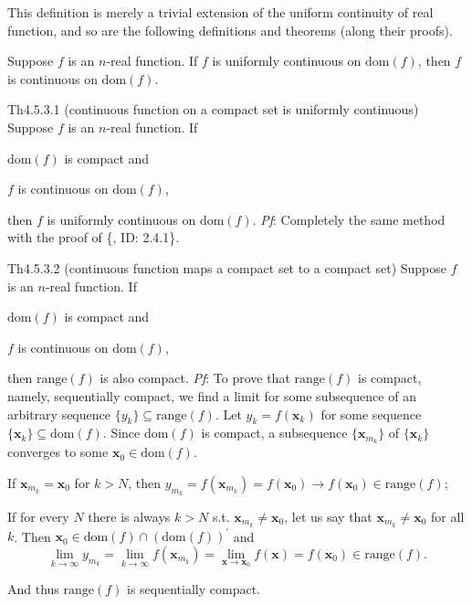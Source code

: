 \documentclass{article}
\begin{document}
\begin{Rmk}{}
    This definition is merely a trivial extension of the uniform continuity of real function, and so are the following definitions and theorems (along their proofs).
    \begin{compactenum}
        \item \textcolor{Th}{Suppose $f$ is an $n$-real function. If $f$ is uniformly continuous on $\text{dom}(f)$, then $f$ is continuous on $\text{dom}(f)$.}
    \end{compactenum}
\end{Rmk}

\begin{Th}{Th4.5.3.1 (continuous function on a compact set is uniformly continuous)}
    Suppose $f$ is an $n$-real function. If
    \begin{compactenum}
        \item $\text{dom}(f)$ is compact and
        \item $f$ is continuous on $\text{dom}(f)$,
    \end{compactenum}
    then $f$ is uniformly continuous on $\text{dom}(f)$.
    \tcblower
    \textit{Pf}: Completely the same method with the proof of \{, ID: 2.4.1\}.
\end{Th}

\begin{Th}{Th4.5.3.2 (continuous function maps a compact set to a compact set)}
    Suppose $f$ is an $n$-real function. If
    \begin{compactenum}
        \item $\text{dom}(f)$ is compact and
        \item $f$ is continuous on $\text{dom}(f)$,
    \end{compactenum}
    then $\text{range}(f)$ is also compact.
    \tcblower
    \textit{Pf}: To prove that $\text{range}(f)$ is compact, namely, sequentially compact, we find a limit for some subsequence of an arbitrary sequence $\{y_k\}\subseteq\text{range}(f)$. Let $y_k = f(\pmb{x}_k)$ for some sequence $\{\pmb{x}_k\}\subseteq\text{dom}(f)$. Since $\text{dom}(f)$ is compact, a subsequence $\{\pmb{x}_{m_k}\}$ of $\{\pmb{x}_k\}$ converges to some $\pmb{x}_0\in\text{dom}(f)$.
    \begin{compactenum}
        \item If $\pmb{x}_{m_k} = \pmb{x}_0$ for $k>N$, then $y_{m_k} = f(\pmb{x}_{m_k}) = f(\pmb{x}_0)\rightarrow f(\pmb{x}_0)\in\text{range}(f)$;
        \item If for every $N$ there is always $k>N$ s.t. $\pmb{x}_{m_k}\neq \pmb{x}_0$, let us say that $\pmb{x}_{m_k}\neq \pmb{x}_0$ for all $k$. Then $\pmb{x}_0\in\text{dom}(f)\cap (\text{dom}(f))^\prime$ and
        $$ \lim\limits_{k\to\infty} y_{m_k} = \lim\limits_{k\to\infty} f(\pmb{x}_{m_k}) = \lim\limits_{\pmb{x}\to\pmb{x}_0} f(\pmb{x}) = f(\pmb{x}_0)\in\text{range}(f). $$
    \end{compactenum}
    And thus $\text{range}(f)$ is sequentially compact.
\end{Th}
\end{document}

